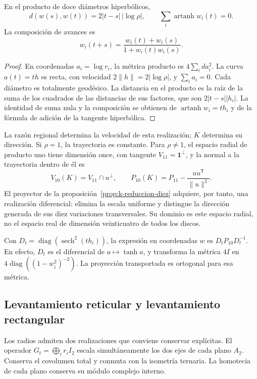 \begin{theorem}
\label{rec:thm:geodesica}
En el producto de doce diámetros hiperbólicos,
\begin{equation}
 d(w(s),w(t))=2|t-s|\,|\log\rho|,\qquad
 \sum_i\operatorname{artanh}w_i(t)=0.
 \label{rec:eq:geodesica}
\end{equation}
La composición de avances es
\[
 w_i(t+s)=\frac{w_i(t)+w_i(s)}{1+w_i(t)w_i(s)}.
\]
\end{theorem}
\begin{proof}
En coordenadas \(a_i=\log r_i\), la métrica producto es \(4\sum_i da_i^2\). La curva \(a(t)=th\) es recta, con velocidad \(2\|h\|=2|\log\rho|\), y \(\sum_i a_i=0\). Cada diámetro es totalmente geodésico. La distancia en el producto es la raíz de la suma de los cuadrados de las distancias de sus factores, que son \(2|t-s||h_i|\). La identidad de suma nula y la composición se obtienen de \(\operatorname{artanh}w_i=th_i\) y de la fórmula de adición de la tangente hiperbólica.
\end{proof}

La razón regional determina la velocidad de esta realización; \(K\) determina su dirección. Si \(\rho=1\), la trayectoria es constante. Para \(\rho\ne1\), el espacio radial de producto uno tiene dimensión once, con tangente \(V_{11}=\mathbf1^\perp\), y la normal a la trayectoria dentro de él es
\[
 V_{10}(K)=V_{11}\cap u^\perp,\qquad
 P_{10}(K)=P_{11}-\frac{uu^{\mathsf T}}{\|u\|^2}.
\]
El proyector de la proposición~\ref{prop:k-reduccion-diez} adquiere, por tanto, una realización diferencial: elimina la escala uniforme y distingue la dirección generada de sus diez variaciones transversales. Su dominio es este espacio radial, no el espacio real de dimensión veinticuatro de todos los discos.

Con \(D_t=\operatorname{diag}(\operatorname{sech}^2(th_i))\), la expresión en coordenadas \(w\) es \(D_tP_{10}D_t^{-1}\). En efecto, \(D_t\) es el diferencial de \(a\mapsto\tanh a\), y transforma la métrica \(4I\) en \(4\operatorname{diag}((1-w_i^2)^{-2})\). La proyección transportada es ortogonal para esa métrica.

\subsection{Levantamiento reticular y levantamiento rectangular}

Los radios admiten dos realizaciones que conviene conservar explícitas. El operador \(G_t=\bigoplus_i r_iI_2\) escala simultáneamente los dos ejes de cada plano \(A_2\). Conserva el covolumen total y conmuta con la isometría ternaria. La homotecia de cada plano conserva su módulo complejo interno.

